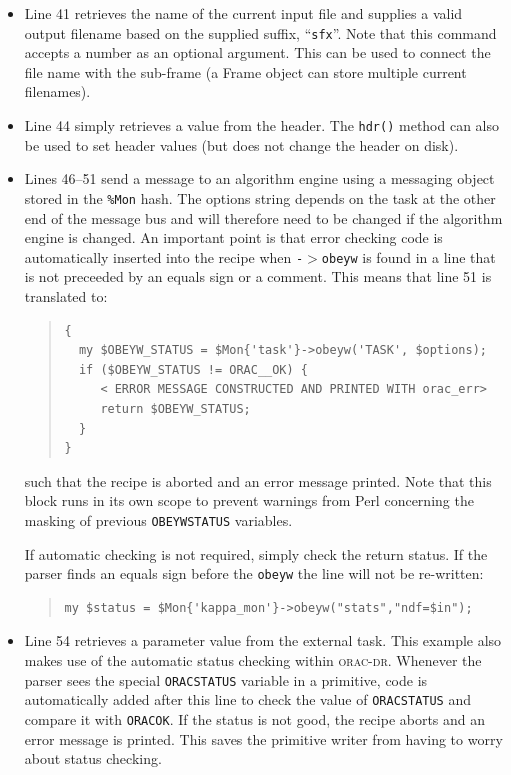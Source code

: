 \documentclass[twoside,11pt]{article}
\renewcommand{\_}{\texttt{\symbol{95}}}
\newcommand{\Oracdr}{\textsc{orac-dr}}
\newenvironment{myquote}{\begin{quote}\begin{small}}{\end{small}\end{quote}}
\begin{document}
\begin{itemize}
\item Line 41 retrieves the name of the current input file and
  supplies a valid output filename based on the supplied suffix,
  ``\texttt{\_sfx}''. Note that this command accepts a number as an
  optional argument. This can be used to connect the file name with
  the sub-frame (a Frame object can store multiple current filenames).

\item Line 44 simply retrieves a value from the header. The
\texttt{hdr()} method can also be used to set header values (but does
not change the header on disk).

\item Lines 46--51 send a message to an algorithm engine using a
messaging object stored in the \texttt{\%Mon} hash. The options
string depends on the task at the other end of the message bus and
will therefore need to be changed if the algorithm engine is changed.
An important point is that error checking code is automatically
inserted into the recipe when  \texttt{-$>$obeyw} is found in a line
that is not preceeded by an equals sign or a comment. This means that
line 51 is translated to:
\begin{myquote}
\begin{verbatim}
{
  my $OBEYW_STATUS = $Mon{'task'}->obeyw('TASK', $options);
  if ($OBEYW_STATUS != ORAC__OK) {
     < ERROR MESSAGE CONSTRUCTED AND PRINTED WITH orac_err>
     return $OBEYW_STATUS;
  }
}
\end{verbatim}
\end{myquote} %
such that the recipe is aborted and an error message printed. Note
that this block runs in its own scope to prevent warnings from Perl
concerning the masking of previous \texttt{OBEYW\_STATUS} variables.

If automatic checking is not required, simply check the return
status. If the parser finds an equals sign before the \texttt{obeyw}
the line will not be re-written:

\begin{myquote}
\begin{verbatim}
my $status = $Mon{'kappa_mon'}->obeyw("stats","ndf=$in");
\end{verbatim}
\end{myquote} %


\item Line 54 retrieves a parameter value from the external task.
This example also makes use of the automatic status checking within
\Oracdr. Whenever the parser sees the special \texttt{ORAC\_STATUS}
variable in a primitive, code is automatically added after this line to
check the value of \texttt{ORAC\_STATUS} and compare it with
\texttt{ORAC\_\_OK}. If the status is not good, the recipe aborts and an
error message is printed. This saves the primitive writer from having
to worry about status checking.


\end{itemize}
\end{document}
